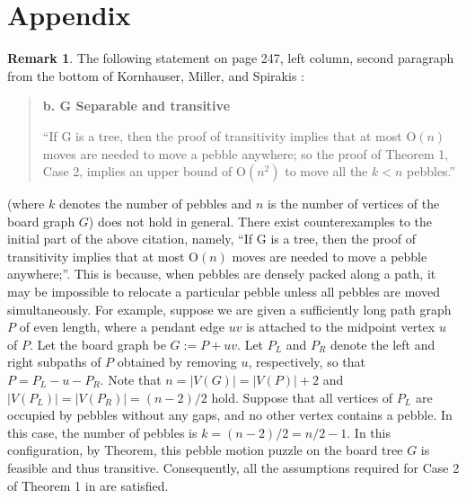 \documentclass[letter,11pt]{article}
\theoremstyle{definition}
\newtheorem{rem}{Remark}
\theoremstyle{definition}
\newcommand{\1}{\boldmath$~1~$\unboldmath}
\newcommand{\Ord}{\mathrm{O}}
\newcommand{\tume}{\hspace*{0.2em}}
\begin{document}
\section*{Appendix}

\begin{rem}\label{counterexample}
The following statement on page 247, left column, second paragraph from the bottom of Kornhauser, Miller, and Spirakis \cite{715921}:
\begin{quote}
\noindent
{\bf b. G Separable and transitive}

\vspace{5pt}

``If G is a tree, then the proof of transitivity implies that at most $\Ord(n)$ moves are needed to move a pebble anywhere;
so the proof of Theorem 1, Case 2, implies an upper bound of $\Ord(n^2)$ to move all the $k < n$ pebbles.''
\end{quote}
(where $k$ denotes the number of pebbles and $n$ is the number of vertices of the board graph $G$) does not hold in general.
There exist counterexamples to the initial part of the above citation, namely,
``If G is a tree, then the proof of transitivity implies that at most $\Ord(n)$ moves are needed to move a pebble anywhere;''.
This is because, when pebbles are densely packed along a path, it may be impossible
to relocate a particular pebble unless all pebbles are moved simultaneously.
For example, suppose we are given a sufficiently long path graph $P$ of even length, 
where a pendant edge $uv$ is attached to the midpoint vertex $u$ of $P$.
Let the board graph be $G:=P+uv$.
Let $P_L$ and $P_R$ denote the left and right subpaths of $P$ obtained by removing $u$, respectively, so that $P = P_L - u - P_R$.
Note that $n=|V(G)|=|V(P)|+2$ and $|V(P_L)|=|V(P_R)|=(n-2)/2$ hold. 
Suppose that all vertices of $P_L$ are occupied by pebbles without any gaps, and no other vertex contains a pebble.
In this case, the number of pebbles is $k = (n - 2)/2 = n/2 - 1$.
In this configuration, by Theorem\tume{A}, this pebble motion puzzle on the board tree $G$ is feasible and thus transitive.
Consequently, all the assumptions required for Case 2 of Theorem 1 in \cite{715921} are satisfied.

\end{rem}
\end{document}
